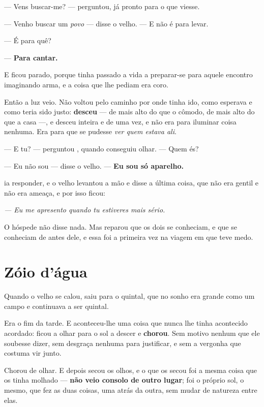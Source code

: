 \documentclass[livro.tex]{subfiles}
\begin{document}
\medskip
\noindent --- Vens buscar-me? --- perguntou, já pronto para o que viesse.

--- Venho buscar um \emph{povo} --- disse o velho. --- E não é para levar.

--- É para quê?

--- \textbf{Para cantar.}

\medskip
\noindent E \Ben ficou parado, porque tinha passado a vida a preparar-se para
aquele encontro imaginando arma, e a coisa que lhe pediam era coro.

\medskip
\noindent Então a luz veio. Não voltou pelo caminho por onde tinha ido, como
\Ben esperava e como teria sido justo: \textbf{desceu} --- de mais alto do que
o cômodo, de mais alto do que a casa ---, e desceu inteira e de uma vez, e não
era para iluminar coisa nenhuma. Era para que se pudesse \emph{ver quem estava
ali}.

\medskip
\noindent --- E tu? --- perguntou \Ben , quando conseguiu olhar. --- Quem és?

--- Eu não sou --- disse o velho. --- \textbf{Eu sou só aparelho.}

\medskip
\noindent \Ben ia responder, e o velho levantou a mão e disse a última coisa,
que não era gentil e não era ameaça, e por isso ficou:

\begin{center}
\emph{--- Eu me apresento quando tu estiveres mais sério.}
\end{center}

\noindent O hóspede não disse nada. Mas \Ben reparou que os dois se conheciam,
e que se conheciam de antes dele, e essa foi a primeira vez na viagem em que
teve medo.

\chapter{Zóio d'água}

Quando o velho se calou, \Ben saiu para o quintal, que no sonho era grande
como um campo e continuava a ser quintal.

Era o fim da tarde. E aconteceu-lhe uma coisa que nunca lhe tinha acontecido
acordado: ficou a olhar para o sol a descer e \textbf{chorou}. Sem motivo
nenhum que ele soubesse dizer, sem desgraça nenhuma para justificar, e sem a
vergonha que costuma vir junto.

\medskip
\noindent Chorou de olhar. E depois secou os olhos, e o que os secou foi a
mesma coisa que os tinha molhado --- \textbf{não veio consolo de outro lugar};
foi o próprio sol, o mesmo, que fez as duas coisas, uma atrás da outra, sem
mudar de natureza entre elas.
\end{document}
